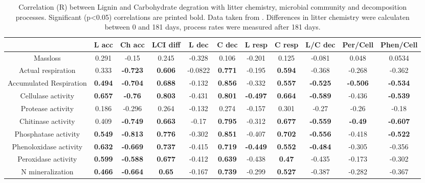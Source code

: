 \documentclass[10pt]{article}
\begin{document}
\begin{table}[h!]
\begin{center}
\caption{Correlation (R) between Lignin and Carbohydrate degration with litter chemistry, microbial community and decomposition processes. Significant (p<0.05) correlations are printed bold. Data taken from \cite{Mooshammer2011, Leitner2011}. Differences in litter chemistry were calculaten between 0 and 181 days, process rates were measured after 181 days.}
\label{corrtable}
{\tiny
\begin{tabular}{ccccccccccc}
  \hline
 & L acc & Ch acc & LCI diff & L dec & C dec & L resp & C resp & L/C dec & Per/Cell & Phen/Cell \\ 
  \hline
Massloss & 0.291 & -0.15 & 0.245 & -0.328 & 0.106 & -0.201 & 0.125 & -0.081 & 0.048 & 0.0534 \\ 
  Actual respiration & 0.333 & \textbf{ -0.723 } & \textbf{ 0.606 } & -0.0822 & \textbf{ 0.771 } & -0.195 & \textbf{ 0.594 } & -0.368 & -0.268 & -0.362 \\ 
  Accumulated Respiration & \textbf{ 0.494 } & \textbf{ -0.704 } & \textbf{ 0.688 } & -0.132 & \textbf{ 0.856 } & -0.332 & \textbf{ 0.557 } & \textbf{ -0.525 } & \textbf{ -0.506 } & \textbf{ -0.534 } \\ 
  Cellulase activity & \textbf{ 0.657 } & \textbf{ -0.76 } & \textbf{ 0.803 } & -0.431 & \textbf{ 0.801 } & \textbf{ -0.497 } & \textbf{ 0.664 } & \textbf{ -0.589 } & -0.436 & \textbf{ -0.539 } \\ 
  Protease activity & 0.186 & -0.296 & 0.264 & -0.132 & 0.274 & -0.157 & 0.301 & -0.27 & -0.26 & -0.18 \\ 
  Chitinase activity & 0.409 & \textbf{ -0.749 } & \textbf{ 0.663 } & -0.17 & \textbf{ 0.795 } & -0.312 & \textbf{ 0.677 } & \textbf{ -0.559 } & \textbf{ -0.49 } & \textbf{ -0.607 } \\ 
  Phosphatase activity & \textbf{ 0.549 } & \textbf{ -0.813 } & \textbf{ 0.776 } & -0.302 & \textbf{ 0.851 } & -0.407 & \textbf{ 0.702 } & \textbf{ -0.556 } & -0.418 & \textbf{ -0.522 } \\ 
  Phenoloxidase activity & \textbf{ 0.632 } & \textbf{ -0.669 } & \textbf{ 0.737 } & -0.415 & \textbf{ 0.719 } & \textbf{ -0.449 } & \textbf{ 0.552 } & \textbf{ -0.484 } & -0.305 & -0.356 \\ 
  Peroxidase activity & \textbf{ 0.599 } & \textbf{ -0.588 } & \textbf{ 0.677 } & -0.412 & \textbf{ 0.639 } & -0.438 & \textbf{ 0.47 } & -0.435 & -0.173 & -0.302 \\ 
  N mineralization & \textbf{ 0.466 } & \textbf{ -0.664 } & \textbf{ 0.65 } & -0.167 & \textbf{ 0.739 } & -0.299 & \textbf{ 0.527 } & -0.387 & -0.282 & -0.367 \\ 

\end{tabular}}
\end{center}
\end{table}
\end{document}
